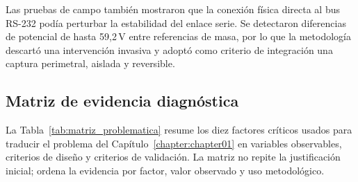 Las pruebas de campo también mostraron que la conexión física directa al bus \ac{RS-232} podía perturbar la estabilidad del enlace serie. Se detectaron diferencias de potencial de hasta 59,2\,V entre referencias de masa, por lo que la metodología descartó una intervención invasiva y adoptó como criterio de integración una captura perimetral, aislada y reversible.

\subsection{Matriz de evidencia diagnóstica}
La Tabla~\ref{tab:matriz_problematica} resume los diez factores críticos usados para traducir el problema del Capítulo~\ref{chapter:chapter01} en variables observables, criterios de diseño y criterios de validación. La matriz no repite la justificación inicial; ordena la evidencia por factor, valor observado y uso metodológico.

